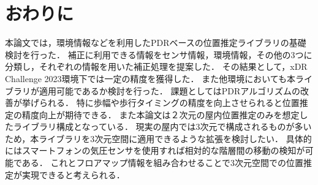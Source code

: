 

\section{おわりに}
本論文では，環境情報などを利用したPDRベースの位置推定ライブラリの基礎検討を行った．
補正に利用できる情報をセンサ情報，環境情報，その他の3つに分類し，それぞれの情報を用いた補正処理を提案した．
その結果として，xDR Challenge 2023環境下では一定の精度を獲得した．
また他環境においても本ライブラリが適用可能であるか検討を行った．
課題としてはPDRアルゴリズムの改善が挙げられる．
特に歩幅や歩行タイミングの精度を向上させられると位置推定の精度向上が期待できる．
また本論文は２次元の屋内位置推定のみを想定したライブラリ構成となっている．
現実の屋内では3次元で構成されるものが多いため，本ライブラリを3次元空間に適用できるような拡張を検討したい．
具体的にはスマートフォンの気圧センサを使用すれば相対的な階層間の移動の検知が可能である．
これとフロアマップ情報を組み合わせることで3次元空間での位置推定が実現できると考えられる．


